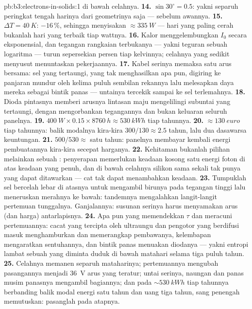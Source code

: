 \begin{solution}{pb:b3:electrons-in-solids:1}
di bawah celahnya.
\textbf{14.} $\sin30^\circ = 0.5$: yakni separuh peringkat tengah harinya
dari geometrinya saja --- sebelum awannya.
\textbf{15.} $\Delta T = \qty{40}{K}$: $-16\,\%$, sehingga menyisakan
$\approx\qty{335}{W}$ --- hari yang paling cerah bukanlah hari yang
terbaik tiap wattnya.
\textbf{16.} Kalor menggelembungkan $I_0$ secara eksponensial, dan
tegangan rangkaian terbukanya --- yakni teguran sebuah logaritma --- turun
sepersekian persen tiap kelvinnya; celahnya yang sedikit menyusut
menuntaskan pekerjaannya.
\textbf{17.} Kabel serinya memaksa satu arus bersama: sel yang
tertaungi, yang tak menghasilkan apa pun, digiring ke panjaran mundur oleh
kelima puluh sembilan rekannya lalu melesapkan daya mereka sebagai bintik panas
--- untainya tercekik sampai ke sel terlemahnya.
\textbf{18.} Dioda pintasnya memberi arusnya lintasan maju
mengelilingi subuntai yang tertaungi, dengan mengorbankan tegangannya dan bukan
keluaran seluruh panelnya.
\textbf{19.} $\qty{400}{W}\times0.15\times\qty{8760}{h} \approx
\qty{530}{kWh}$ tiap tahunnya.
\textbf{20.} $\approx\qty{130}{euro}$ tiap tahunnya: balik modalnya
kira-kira $300/130 \approx 2.5$ tahun, lalu dua dasawarsa keuntungan.
\textbf{21.} $500/530 \approx$ satu tahun: panelnya membayar kembali
energi pembuatannya kira-kira secepat harganya.
\textbf{22.} Kehitaman bukanlah pilihan melainkan sebuah :
penyerapan memerlukan keadaan kosong satu energi foton di atas keadaan
yang penuh, dan di bawah celahnya silikon sama sekali tak punya yang dapat
ditawarkan --- cat tak dapat menambahkan keadaan.
\textbf{23.} Tumpuklah sel bercelah lebar di atasnya untuk mengambil birunya pada
tegangan tinggi lalu meneruskan merahnya ke bawah: tandemnya mengalahkan
langit-langit pertemuan tunggalnya. Ganjalannya: susunan serinya harus
menyamakan arus (dan harga) antarlapisnya.
\textbf{24.} Apa pun yang memendekkan $\tau$ dan meracuni pertemuannya:
cacat yang tercipta oleh ultraungu dan pengotor yang berdifusi masuk
menghamburkan dan memerangkap pembawanya, kelembapan mengaratkan
sentuhannya, dan bintik panas menuakan diodanya --- yakni entropi lambat
sebuah  yang diminta duduk di bawah matahari selama tiga puluh tahun.
\textbf{25.} Celahnya memanen separuh mataharinya; pertemuannya mengubah
pasangannya menjadi \qty{36}{V} arus yang teratur; untai serinya,
naungan dan panas musim panasnya mengambil bagiannya; dan pada
$\sim\qty{530}{kWh}$ tiap tahunnya berbanding balik modal energi satu tahun dan
uang tiga tahun, sang penengah memutuskan: pasanglah pada atapnya.
\end{solution}
